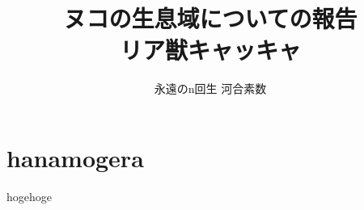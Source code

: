\documentclass[uplatex,a4paper,dvipdfmx]{jsarticle}
\begin{document}
\title{ヌコの生息域についての報告 \\ リア獣キャッキャ}
\author{永遠のn回生 河合素数}
\date{}
\maketitle

\tableofcontents

\section{hanamogera}

hogehoge



\end{document}
